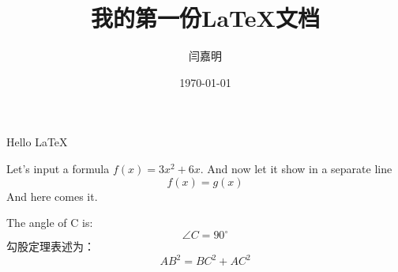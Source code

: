 \documentclass[UTF8]{article}
\title{\heiti 我的第一份LaTeX文档}
\author{\kaishu 闫嘉明} %
\date{\heiti \today}
\newcommand{\degree}{^\circ} %
\begin{document}
    \maketitle
    Hello \LaTeX

    Let's input a formula $f(x)=3x^2+6x$. %
    And now let it show in a separate line $$f(x)=g(x)$$ And here comes it.

    The angle of C is: $$\angle C=90 \degree$$ %
    勾股定理表述为：
    \begin{equation}
        AB^2=BC^2+AC^2
    \end{equation} 
    
\end{document}
